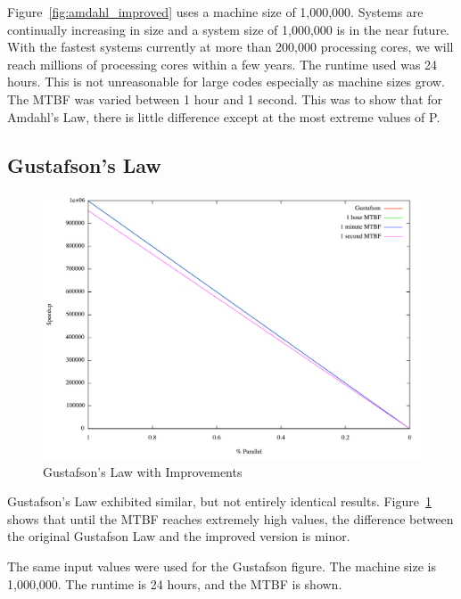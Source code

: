 \documentclass[]{article}
\begin{document}
Figure~\ref{fig:amdahl_improved} uses a machine size of 1,000,000. Systems are continually increasing in size and a system size of 1,000,000 is in the near future. With the fastest systems currently at more than 200,000 processing cores, we will reach millions of processing cores within a few years. The runtime used was 24 hours. This is not unreasonable for large codes especially as machine sizes grow. The MTBF was varied between 1 hour and 1 second. This was to show that for Amdahl's Law, there is little difference except at the most extreme values of P.

\subsection{Gustafson's Law}
\label{subsect:gustafson_results}

\begin{figure}
	\begin{center}
		\includegraphics[scale=0.25]{GusImp.pdf}
		\caption{\small Gustafson's Law with Improvements}
		\label{fig:gustafson_improved}
	\end{center}
\end{figure}

Gustafson's Law exhibited similar, but not entirely identical results. Figure~\ref{fig:gustafson_improved} shows that until the MTBF reaches extremely high values, the difference between the original Gustafson Law and the improved version is minor.

The same input values were used for the Gustafson figure. The machine size is 1,000,000. The runtime is 24 hours, and the MTBF is shown.
\end{document}
